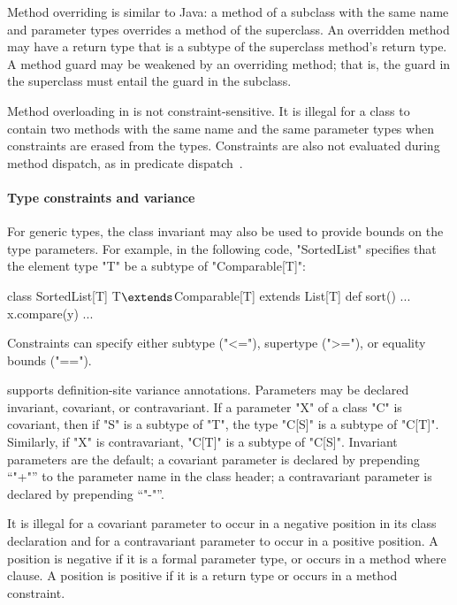 Method overriding is similar to Java: a method of a subclass
with the same name and parameter types overrides a method of the
superclass.  An overridden method may have a return type that is
a subtype of the superclass method's return type.
A method guard may be weakened by an overriding
method; that is, the guard in the superclass must entail the  
guard in the subclass.

Method overloading in \Xten is not constraint-sensitive.  It is
illegal for a class to contain two methods with the same name
and the same parameter types when constraints are erased from the 
types.  Constraints are also not evaluated during method
dispatch, as in predicate dispatch~\cite{jpred}.


\paragraph{Type constraints and variance}
\label{sec:variance-overview}

For generic types, the class invariant may also be used to provide 
bounds on the type parameters.
For example, in the following code,
\xcd"SortedList" 
specifies that the element type \xcd"T"
be a subtype of \xcd"Comparable[T]":
\begin{xtenmathnoindent}
 class SortedList[T] {T$\extends$Comparable[T]} extends List[T] {
   def sort() { ... x.compare(y) ... }
 }
\end{xtenmathnoindent}
Constraints can specify either subtype (\xcd"<="), supertype (\xcd">="),
or equality bounds (\xcd"==").

\Xten supports definition-site variance annotations.
Parameters may be declared invariant, covariant, or
contravariant.
If a parameter \xcd"X" of a class \xcd"C" is covariant,
then if \xcd"S" is a subtype of
\xcd"T", the type \xcd"C[S]" is a subtype of \xcd"C[T]".
Similarly, if \xcd"X" is contravariant, 
\xcd"C[T]" is a subtype of \xcd"C[S]".
Invariant parameters are the default; a covariant parameter is
declared by prepending ``\xcd"+"'' to the parameter name in the
class header; a contravariant parameter is declared by
prepending ``\xcd"-"''.

It is illegal for a covariant parameter to occur in a negative
position in its class declaration and for a contravariant
parameter to occur in a positive position.  A position is
negative if it is a formal parameter type, or occurs in a method
where clause.  A position is positive if it is a return type or
occurs in a method constraint.

